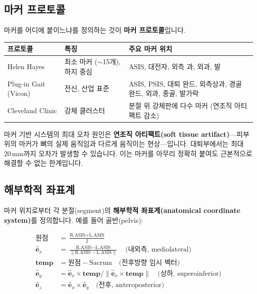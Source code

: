\documentclass[11pt, a4paper]{report}
\begin{document}
\subsection{마커 프로토콜}

마커를 어디에 붙이느냐를 정의하는 것이 \textbf{마커 프로토콜}입니다.

\begin{center}
\renewcommand{\arraystretch}{1.3}
\small
\begin{tabular}{p{3cm}p{4cm}p{5cm}}
\toprule
\textbf{프로토콜} & \textbf{특징} & \textbf{주요 마커 위치} \\
\midrule
Helen Hayes & 최소 마커 ($\sim$15개), 하지 중심 & ASIS, 대전자, 외측 과, 외과, 발 \\
\addlinespace
Plug-in Gait (Vicon) & 전신, 산업 표준 & ASIS, PSIS, 대퇴 완드, 외측상과, 경골 완드, 외과, 종골, 발가락 \\
\addlinespace
Cleveland Clinic & 강체 클러스터 & 분절 위 강체판에 다수 마커 (연조직 아티팩트 감소) \\
\bottomrule
\end{tabular}
\end{center}

\begin{clinicalnote}
마커 기반 시스템의 최대 오차 원인은 \textbf{연조직 아티팩트(soft tissue artifact)}---피부 위의 마커가 뼈의 실제 움직임과 다르게 움직이는 현상---입니다. 대퇴부에서는 최대 20\,mm까지 오차가 발생할 수 있습니다. 이는 마커를 아무리 정확히 붙여도 근본적으로 해결할 수 없는 한계입니다.
\end{clinicalnote}

\subsection{해부학적 좌표계}

마커 위치로부터 각 분절(segment)의 \textbf{해부학적 좌표계(anatomical coordinate system)}를 정의합니다. 예를 들어 골반(pelvis):

\begin{align}
\text{원점} &= \frac{\text{R.ASIS} + \text{L.ASIS}}{2} \\[4pt]
\hat{\mathbf{e}}_x &= \frac{\text{R.ASIS} - \text{L.ASIS}}{\|\text{R.ASIS} - \text{L.ASIS}\|} \quad \text{(내외측, mediolateral)} \\[4pt]
\mathbf{temp} &= \text{원점} - \text{Sacrum} \quad \text{(전후방향 임시 벡터)} \\[4pt]
\hat{\mathbf{e}}_y &= \hat{\mathbf{e}}_x \times \mathbf{temp} / \| \hat{\mathbf{e}}_x \times \mathbf{temp} \| \quad \text{(상하, superoinferior)} \\[4pt]
\hat{\mathbf{e}}_z &= \hat{\mathbf{e}}_x \times \hat{\mathbf{e}}_y \quad \text{(전후, anteroposterior)}
\end{align}
\end{document}
